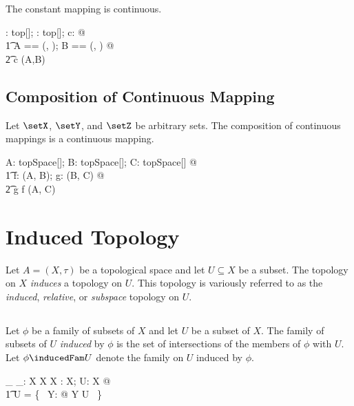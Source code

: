 \documentclass{amsart}
\begin{document}
\begin{remark}
The constant mapping is continuous.

\begin{zed}
	\forall \tau: top[\setX]; \sigma: top[\setY]; c: \setY @ \\
	\t1	\LET A == (\setX, \tau); B == (\setY, \sigma) @ \\
	\t2		\const[\setX,\setY] c \in \CzeroTT(A,B)
\end{zed}

\end{remark}

\subsection{Composition of Continuous Mapping}

\begin{remark}
Let $\setX$, $\setY$, and $\setZ$ be arbitrary sets.
The composition of continuous mappings is a continuous mapping.

\begin{zed}
	\forall A: topSpace[\setX]; B: topSpace[\setY]; C: topSpace[\setZ] @ \\
	\t1	\forall f: \CzeroTT(A, B); g: \CzeroTT(B, C) @ \\
	\t2		g \circ f \in \CzeroTT(A, C)
\end{zed}

\end{remark}

\section{Induced Topology}

Let $A = (X, \tau)$ be a topological space and let $U \subseteq X$ be a subset.
The topology on $X$ {\it induces} a topology on $U$.
This topology is variously referred to as the {\it induced}, {\it relative}, or {\it subspace} topology on $U$.

\subsection{}

Let $\phi$ be a family of subsets of $X$ and let $U$ be a subset of $X$.
The family of subsets of $U$ {\it induced} by $\phi$ is the set of intersections of the members of $\phi$ with $U$.
Let $\phi \inducedFam U$ denote the family on $U$ induced by $\phi$.

\begin{gendef}[X]
	\_ \inducedFam \_:  \Fam X \cross \power X \fun \Fam X
\where
	\forall \phi: \Fam X; U: \power X @ \\
	\t1	\phi \inducedFam U = \{~ Y: \phi @ Y \cap U ~\}
\end{gendef}
\end{document}
